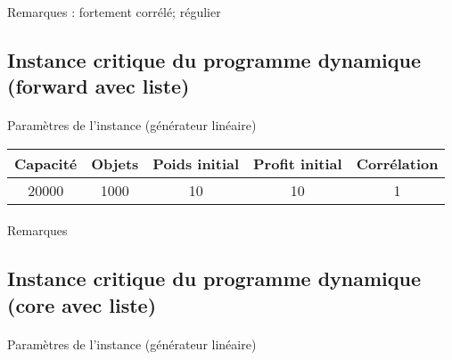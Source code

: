 \documentclass[12pt]{article}
\begin{document}
\paragraph{}Remarques : fortement corrélé; régulier

\subsection{Instance critique du programme dynamique (forward avec liste)}

\paragraph{}Paramètres de l'instance (générateur linéaire)

\begin{tabular}{|c|c|c|c|c|}
	\hline
	Capacité & Objets & Poids initial & Profit initial & Corrélation \\
	\hline
	20000 & 1000 & 10 & 10 & 1 \\
	\hline
\end{tabular}

\begin{figure}[!h]
\begin{floatrow}
\end{floatrow}
\end{figure}

\paragraph{}Remarques

\subsection{Instance critique du programme dynamique (core avec liste)}

\paragraph{}Paramètres de l'instance (générateur linéaire)
\end{document}
